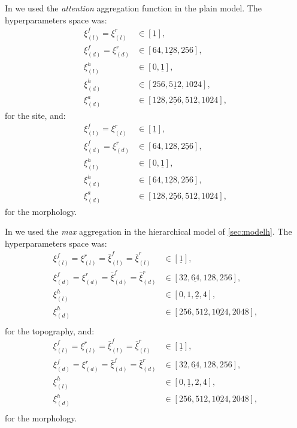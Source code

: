In \softmax{} we used the \emph{attention} aggregation function in the
plain model. The hyperparameters
space was:
\begin{align*}
  \xi_{(l)}^f=\xi_{(l)}^r&\in[\underline{1}],\\
  \xi_{(d)}^f=\xi_{(d)}^r&\in[64,\underline{128},256],\\
  \xi_{(l)}^h&\in[0,\underline{1}],\\
  \xi_{(d)}^h&\in[256,\underline{512},1024],\\
  \xi_{(d)}^a&\in[128,\underline{256},512,1024],
\end{align*}
for the site, and:
\begin{align*}
  \xi_{(l)}^f=\xi_{(l)}^r&\in[\underline{1}],\\
  \xi_{(d)}^f=\xi_{(d)}^r&\in[64,128,\underline{256}],\\
  \xi_{(l)}^h&\in[0,\underline{1}],\\
  \xi_{(d)}^h&\in[64,\underline{128},256],\\
  \xi_{(d)}^a&\in[128,\underline{256},512,1024],
\end{align*}
for the morphology.

In \maxh{} we used the \emph{max} aggregation in the hierarchical
model of \cref{sec:modelh}. The hyperparameters space was:
\begin{align*}
  \xi_{(l)}^f=\xi_{(l)}^r=\bar{\xi}^f_{(l)}=\bar{\xi}^r_{(l)}&\in[\underline{1}],\\
  \xi_{(d)}^f=\xi_{(d)}^r=\bar{\xi}^f_{(d)}=\bar{\xi}^r_{(d)}&\in[32,\underline{64},128,256],\\
  \xi_{(l)}^h&\in[0,1,\underline{2},4],\\
  \xi_{(d)}^h&\in[256,512,\underline{1024},2048],\\
\end{align*}
for the topography, and:
\begin{align*}
  \xi_{(l)}^f=\xi_{(l)}^r=\bar{\xi}^f_{(l)}=\bar{\xi}^r_{(l)}&\in[\underline{1}],\\
  \xi_{(d)}^f=\xi_{(d)}^r=\bar{\xi}^f_{(d)}=\bar{\xi}^r_{(d)}&\in[32,\underline{64},128,256],\\
  \xi_{(l)}^h&\in[0,\underline{1},2,4],\\
  \xi_{(d)}^h&\in[256,512,\underline{1024},2048],\\
\end{align*}
for the morphology.

